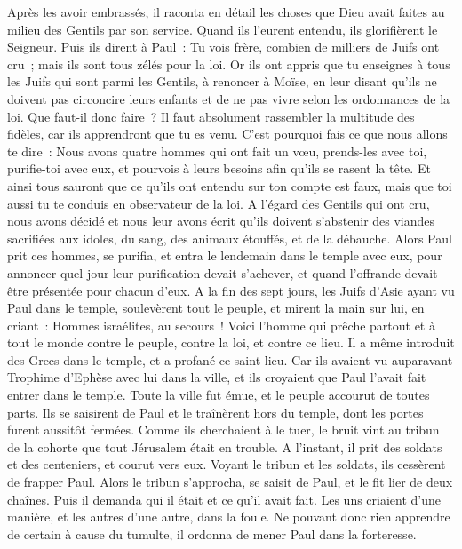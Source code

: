 \begin{multicols}{2}
Après les avoir embrassés, il raconta en détail les choses que Dieu avait faites au milieu des Gentils par son service.
Quand ils l'eurent entendu, ils glorifièrent le Seigneur. Puis ils dirent à Paul~: Tu vois frère, combien de milliers de Juifs ont cru~; mais ils sont tous zélés pour la loi.
Or ils ont appris que tu enseignes à tous les Juifs qui sont parmi les Gentils, à renoncer à Moïse, en leur disant qu'ils ne doivent pas circoncire leurs enfants et de ne pas vivre selon les ordonnances de la loi.
Que faut-il donc faire~? Il faut absolument rassembler la multitude des fidèles, car ils apprendront que tu es venu.
C'est pourquoi fais ce que nous allons te dire~: Nous avons quatre hommes qui ont fait un vœu,
prends-les avec toi, purifie-toi avec eux, et pourvois à leurs besoins afin qu'ils se rasent la tête. Et ainsi tous sauront que ce qu'ils ont entendu sur ton compte est faux, mais que toi aussi tu te conduis en observateur de la loi.
A l'égard des Gentils qui ont cru, nous avons décidé et nous leur avons écrit qu'ils doivent s'abstenir des viandes sacrifiées aux idoles, du sang, des animaux étouffés, et de la débauche.
Alors Paul prit ces hommes, se purifia, et entra le lendemain dans le temple avec eux, pour annoncer quel jour leur purification devait s'achever, et quand l'offrande devait être présentée pour chacun d'eux.
A la fin des sept jours, les Juifs d'Asie ayant vu Paul dans le temple, soulevèrent tout le peuple, et mirent la main sur lui,
en criant~: Hommes israélites, au secours~! Voici l'homme qui prêche partout et à tout le monde contre le peuple, contre la loi, et contre ce lieu. Il a même introduit des Grecs dans le temple, et a profané ce saint lieu.
Car ils avaient vu auparavant Trophime d'Ephèse avec lui dans la ville, et ils croyaient que Paul l'avait fait entrer dans le temple.
Toute la ville fut émue, et le peuple accourut de toutes parts. Ils se saisirent de Paul et le traînèrent hors du temple, dont les portes furent aussitôt fermées.
Comme ils cherchaient à le tuer, le bruit vint au tribun de la cohorte que tout Jérusalem était en trouble.
A l'instant, il prit des soldats et des centeniers, et courut vers eux. Voyant le tribun et les soldats, ils cessèrent de frapper Paul.
Alors le tribun s'approcha, se saisit de Paul, et le fit lier de deux chaînes. Puis il demanda qui il était et ce qu'il avait fait.
Les uns criaient d'une manière, et les autres d'une autre, dans la foule. Ne pouvant donc rien apprendre de certain à cause du tumulte, il ordonna de mener Paul dans la forteresse.

\end{multicols}
